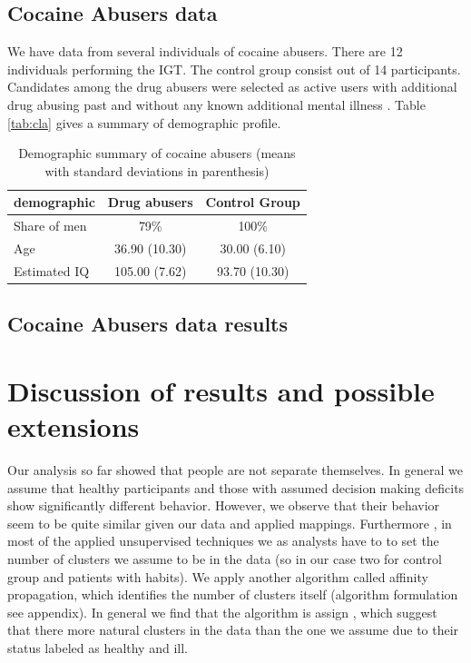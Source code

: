 \documentclass[12pt,a4paper,bibliography=totocnumbered,listof=totocnumbered]{scrartcl}
\begin{document}
\subsection{Cocaine Abusers data}

We have data from several individuals of cocaine abusers. There are 12 individuals performing the IGT. The control group consist out of 14 participants. Candidates among the drug abusers were selected as active users with additional drug abusing past and without any known additional mental illness \cite{stout2004}. Table \ref{tab:cla} gives a summary of demographic profile.

\setlength{\tabcolsep}{12pt}
\renewcommand{\arraystretch}{1}
\begin{table}[!htbp]
	\centering 
	\begin{tabular}{lcc}
		\toprule
		\textbf{demographic} & \textbf{Drug abusers} & \textbf{Control Group} \\
		\hline
		Share of men &  79\% & 100\%\\
		Age & 36.90 (10.30) & 30.00 (6.10) \\
		Estimated IQ & 105.00 (7.62) & 93.70 (10.30) \\
		\bottomrule
	\end{tabular}
	\caption{Demographic summary of cocaine abusers (means with standard deviations in parenthesis)}
	\label{tab:cocs}
\end{table}

\subsection{Cocaine Abusers data results}

\section{Discussion of results and possible extensions }

Our analysis so far showed that people are not separate themselves. In general we assume that healthy participants and those with assumed decision making deficits show significantly different behavior. However, we observe that their behavior seem to be quite similar given our data and applied mappings. Furthermore , in most of the applied unsupervised techniques we as analysts have to to set the number of clusters we assume to be in the data (so in our case two for control group and patients with habits). We apply another algorithm called affinity propagation, which identifies the number of clusters itself (algorithm formulation see appendix). In general we find that the algorithm is assign , which suggest that there more natural clusters in the data than the  one we assume due to their status labeled as healthy and ill.
\end{document}
